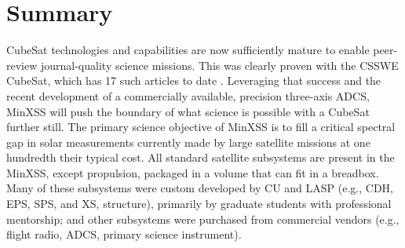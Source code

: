 \section{Summary}
CubeSat technologies and capabilities are now sufficiently mature to enable peer-review journal-quality science missions. This was clearly proven with the CSSWE CubeSat, which has 17 such articles to date \citep{Li2012, Gerhardt2013, Li2013, Li2013a, Li2015, Baker2014, Jaynes2014, Schiller2014a, Schiller2014b, Blum2013, Blum2012, Kohnert2011, Palo2010, Schiller2010, Gerhardt2010, Gerhardt2016, Gerhardt2016b}. Leveraging that success and the recent development of a commercially available, precision three-axis ADCS, MinXSS will push the boundary of what science is possible with a CubeSat further still. The primary science objective of MinXSS is to fill a critical spectral gap in solar measurements currently made by large satellite missions at one hundredth their typical cost. All standard satellite subsystems are present in the MinXSS, except propulsion, packaged in a volume that can fit in a breadbox. Many of these subsystems were custom developed by CU and LASP (e.g., CDH, EPS, SPS, and XS, structure), primarily by graduate students with professional mentorship; and other subsystems were purchased from commercial vendors (e.g., flight radio, ADCS, primary science instrument).